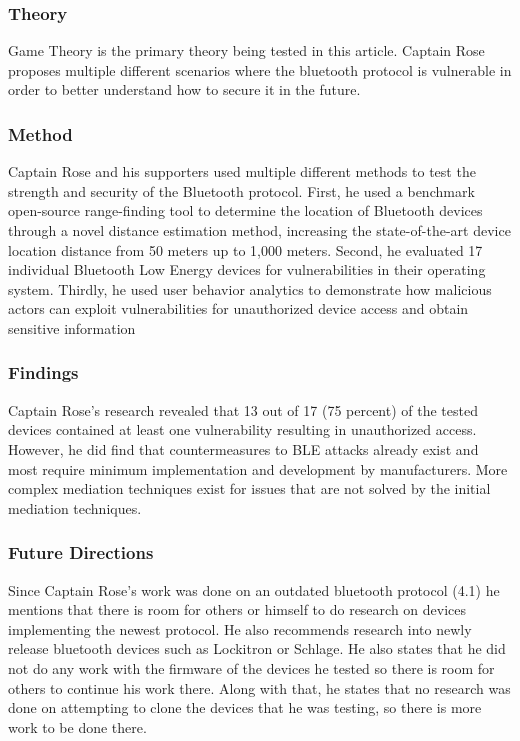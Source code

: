\subsubsection{Theory}

\noindent
Game Theory is the primary theory being tested in this article.  Captain Rose proposes multiple different scenarios where the bluetooth protocol is vulnerable in order to better understand how to secure it in the future.

\subsubsection{Method}

\noindent
Captain Rose and his supporters used multiple different methods to test the strength and security of the Bluetooth protocol. First, he used a benchmark open-source range-finding tool to determine the location of Bluetooth devices through a novel distance estimation method, increasing the state-of-the-art device location distance from 50 meters up to 1,000 meters. Second, he evaluated 17 individual Bluetooth Low Energy devices for vulnerabilities in their operating system. Thirdly, he used user behavior analytics to demonstrate how malicious actors can exploit vulnerabilities for unauthorized device access and obtain sensitive information

\subsubsection{Findings}

\noindent
Captain Rose's research revealed that 13 out of 17 (75 percent) of the tested devices contained at least one vulnerability resulting in unauthorized access. However, he did find that countermeasures to BLE attacks already exist and most require minimum implementation and development by manufacturers. More complex mediation techniques exist for issues that are not solved by the initial mediation techniques.

\subsubsection{Future Directions}

\noindent
Since Captain Rose's work was done on an outdated bluetooth protocol (4.1) he mentions that there is room for others or himself to do research on devices implementing the newest protocol. He also recommends research into newly release bluetooth devices such as Lockitron or Schlage. He also states that he did not do any work with the firmware of the devices he tested so there is room for others to continue his work there. Along with that, he states that no research was done on attempting to clone the devices that he was testing, so there is more work to be done there.

